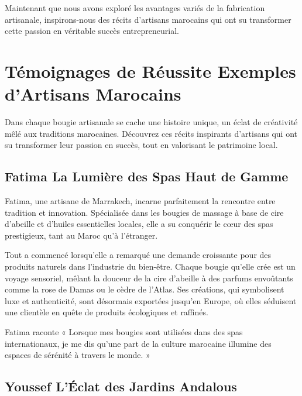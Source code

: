 \documentclass[11pt,fleqn,onecolumn,oneside]{book}
\begin{document}
\begin{remark}
Maintenant que nous avons exploré les avantages variés de la fabrication artisanale, inspirons-nous des récits d’artisans marocains qui ont su transformer cette passion en véritable succès entrepreneurial.
\end{remark}

\section{Témoignages de Réussite Exemples d’Artisans Marocains}

\begin{definition}
Dans chaque bougie artisanale se cache une histoire unique, un éclat de créativité mêlé aux traditions marocaines. Découvrez ces récits inspirants d’artisans qui ont su transformer leur passion en succès, tout en valorisant le patrimoine local.
\end{definition}

\subsection*{Fatima La Lumière des Spas Haut de Gamme}

\begin{remark}
Fatima, une artisane de Marrakech, incarne parfaitement la rencontre entre tradition et innovation. Spécialisée dans les bougies de massage à base de cire d’abeille et d’huiles essentielles locales, elle a su conquérir le cœur des spas prestigieux, tant au Maroc qu’à l’étranger.
\end{remark}

Tout a commencé lorsqu’elle a remarqué une demande croissante pour des produits naturels dans l’industrie du bien-être. Chaque bougie qu’elle crée est un voyage sensoriel, mêlant la douceur de la cire d’abeille à des parfums envoûtants comme la rose de Damas ou le cèdre de l’Atlas. Ses créations, qui symbolisent luxe et authenticité, sont désormais exportées jusqu’en Europe, où elles séduisent une clientèle en quête de produits écologiques et raffinés.

\begin{example}
Fatima raconte « Lorsque mes bougies sont utilisées dans des spas internationaux, je me dis qu’une part de la culture marocaine illumine des espaces de sérénité à travers le monde. »
\end{example}

\subsection*{Youssef L’Éclat des Jardins Andalous}
\end{document}
